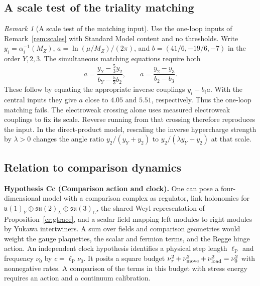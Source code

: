 \documentclass[aps,pra,onecolumn,superscriptaddress,nofootinbib,10pt]{revtex4-2}
\theoremstyle{definition}
\theoremstyle{remark}
\newtheorem{remark}[theorem]{Remark}
\begin{document}
\subsection{A scale test of the triality matching}

\begin{remark}[A scale test of the matching input]\label{tr:running}
Use the one-loop inputs of Remark~\ref{rem:scales} with Standard Model
content and no thresholds. Write \(y_i=\alpha_i^{-1}(M_Z)\),
\(a=\ln(\mu/M_Z)/(2\pi)\), and \(b=(41/6,-19/6,-7)\) in the
order \(Y,2,3\). The simultaneous matching equations require both
\[
 a=\frac{y_Y-\tfrac53y_2}{b_Y-\tfrac53 b_2},
 \qquad
 a=\frac{y_2-y_3}{b_2-b_3}.
\]
These follow by equating the appropriate inverse couplings
\(y_i-b_i a\). With the central inputs they give \(a\) close to
\(4.05\) and \(5.51\), respectively. Thus the one-loop matching fails.
The electroweak crossing alone uses measured electroweak couplings to
fix its scale. Reverse running from that crossing therefore reproduces
the input. In the direct-product model, rescaling the inverse
hypercharge strength by \(\lambda>0\) changes the angle ratio
\(y_2/(y_Y+y_2)\) to \(y_2/(\lambda y_Y+y_2)\) at that scale.
\end{remark}

\subsection{Relation to comparison dynamics}

\smallskip\noindent\textbf{Hypothesis Cc (Comparison action and clock).}\label{hyp:Cc}  One can pose a four-dimensional model with a comparison complex
as regulator, link holonomies for
$\mathfrak u(1)_Y\oplus\mathfrak{su}(2)_L\oplus\mathfrak{su}(3)_C$,
the shared Weyl representation of Proposition~\ref{cr:gtrace},
and a scalar field mapping left modules to right modules by
Yukawa intertwiners. A sum over fields and comparison geometries
would weight the gauge plaquettes, the scalar and fermion terms,
and the Regge hinge action. An independent clock hypothesis
identifies a physical step length $\ell_{\mathrm P}$ and
frequency $\nu_0$ by $c=\ell_{\mathrm P}\nu_0$. It posits a square
budget $\nu_\tau^2+\nu_{\rm move}^2+\nu_{\rm load}^2=\nu_0^2$
with nonnegative rates. A comparison of the terms in this budget
with stress energy requires an action and a continuum calibration.
\end{document}
